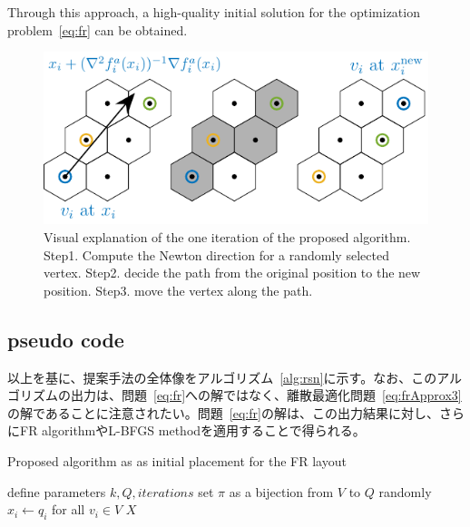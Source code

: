 \documentclass[dvipdfmx,lettersize,journal]{IEEEtran}
\begin{document}
Through this approach, a high-quality initial solution for the optimization problem~\eqref{eq:fr} can be obtained.

\begin{figure}[t]
  \centering
  \includegraphics[width=\columnwidth]{hex/hex.pdf}
  \caption{Visual explanation of the one iteration of the proposed algorithm. Step1. Compute the Newton direction for a randomly selected vertex. Step2. decide the path from the original position to the new position. Step3. move the vertex along the path.}
  \label{fig:hex}
\end{figure}

\subsection{pseudo code}\label{ssec:pseudoCode}

以上を基に、提案手法の全体像をアルゴリズム~\ref{alg:rsn}に示す。なお、このアルゴリズムの出力は、問題~\eqref{eq:fr}への解ではなく、離散最適化問題~\eqref{eq:frApprox3}の解であることに注意されたい。問題~\eqref{eq:fr}の解は、この出力結果に対し、さらにFR algorithmやL-BFGS methodを適用することで得られる。

\begin{algorithm}[ht]
  \caption{Proposed algorithm as as initial placement for the FR layout}
  \label{alg:rsn}

  define parameters $k, Q, \textit{iterations}$\;
  set $\pi$ as a bijection from $V$ to $Q$ randomly\;
  $x_i \gets q_i$ for all $v_i \in V$\;
  \Return $X$
\end{algorithm}
\end{document}
